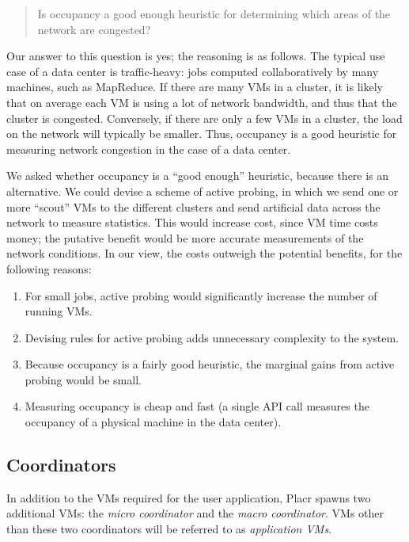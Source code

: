 \documentclass[11pt]{article}
\begin{document}
\begin{quote}
Is occupancy a good enough heuristic for determining which areas of the network are congested?
\end{quote}

Our answer to this question is yes; the reasoning is as follows.  The typical use case of a data center is traffic-heavy: jobs computed collaboratively by many machines, such as MapReduce.  If there are many VMs in a cluster, it is likely that on average each VM is using a lot of network bandwidth, and thus that the cluster is congested.  Conversely, if there are only a few VMs in a cluster, the load on the network will typically be smaller.  Thus, occupancy is a good heuristic for measuring network congestion in the case of a data center.

We asked whether occupancy is a ``good enough'' heuristic, because there is an alternative.  We could devise a scheme of active probing, in which we send one or more ``scout'' VMs to the different clusters and send artificial data across the network to measure statistics.  This would increase cost, since VM time costs money; the putative benefit would be more accurate measurements of the network conditions.  In our view, the costs outweigh the potential benefits, for the following reasons:

\begin{enumerate}[noitemsep]
  \item For small jobs, active probing would significantly increase the number of running VMs.
  \item Devising rules for active probing adds unnecessary complexity to the system.
  \item Because occupancy is a fairly good heuristic, the marginal gains from active probing would be small.
  \item Measuring occupancy is cheap and fast (a single API call measures the occupancy of a physical machine in the data center).
\end{enumerate}

\subsection{Coordinators}

In addition to the VMs required for the user application, Placr spawns two additional VMs: the \textit{micro coordinator} and the \textit{macro coordinator}.  VMs other than these two coordinators will be referred to as \textit{application VMs}.
\end{document}
